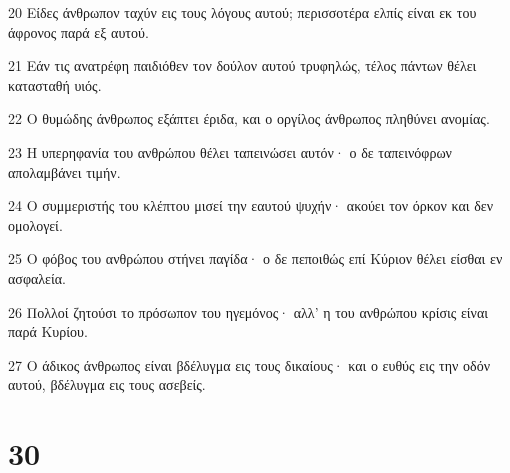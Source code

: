 \par 20 Είδες άνθρωπον ταχύν εις τους λόγους αυτού; περισσοτέρα ελπίς είναι εκ του άφρονος παρά εξ αυτού.
\par 21 Εάν τις ανατρέφη παιδιόθεν τον δούλον αυτού τρυφηλώς, τέλος πάντων θέλει κατασταθή υιός.
\par 22 Ο θυμώδης άνθρωπος εξάπτει έριδα, και ο οργίλος άνθρωπος πληθύνει ανομίας.
\par 23 Η υπερηφανία του ανθρώπου θέλει ταπεινώσει αυτόν· ο δε ταπεινόφρων απολαμβάνει τιμήν.
\par 24 Ο συμμεριστής του κλέπτου μισεί την εαυτού ψυχήν· ακούει τον όρκον και δεν ομολογεί.
\par 25 Ο φόβος του ανθρώπου στήνει παγίδα· ο δε πεποιθώς επί Κύριον θέλει είσθαι εν ασφαλεία.
\par 26 Πολλοί ζητούσι το πρόσωπον του ηγεμόνος· αλλ' η του ανθρώπου κρίσις είναι παρά Κυρίου.
\par 27 Ο άδικος άνθρωπος είναι βδέλυγμα εις τους δικαίους· και ο ευθύς εις την οδόν αυτού, βδέλυγμα εις τους ασεβείς.

\chapter{30}

